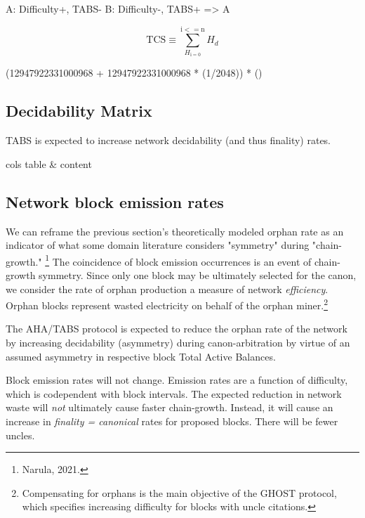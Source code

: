 \documentclass[11pt]{article}
\theoremstyle{plain}
\begin{document}
{{    A: Difficulty+, TABS-
B: Difficulty-, TABS+
    => A


    \begin{equation}
        \mathrm{TCS} \equiv \sum_{H_\mathrm{i = 0}}^{\mathrm{i <= n}} H_d
    \end{equation}


    (12947922331000968 + 12947922331000968 * (1/2048)) * ()

    \subsection{\normalsize{Decidability Matrix}}

    TABS is expected to increase network decidability (and thus finality) rates.

    \begin{tabular}[pos]{cols}
        table & content
    \end{tabular}

}
\subsection{\normalsize{Network block emission rates}}

We can reframe the previous section's theoretically modeled orphan rate
as an indicator of what some domain literature considers "symmetry" during "chain-growth."\nolinebreak
\footnote{Narula, 2021.}
The coincidence of block emission occurrences is an event of chain-growth symmetry.
Since only one block may be ultimately selected for the canon, we consider the rate of orphan production
a measure of network \emph{efficiency}.
Orphan blocks represent wasted electricity on behalf of the orphan miner.\footnote{
    Compensating for orphans is the main objective of the GHOST protocol,
    which specifies increasing difficulty for blocks with uncle citations.
}

The AHA/TABS protocol is expected to reduce the orphan rate of the network by increasing decidability (asymmetry)
during canon-arbitration by virtue of an assumed asymmetry in respective block Total Active Balances.

Block emission rates will not change.
Emission rates are a function of difficulty, which is codependent with block intervals.
The expected reduction in network waste will \emph{not} ultimately cause faster chain-growth.
Instead, it will cause an increase in \emph{finality = canonical} rates for proposed blocks.
There will be fewer uncles.

}
\end{document}
